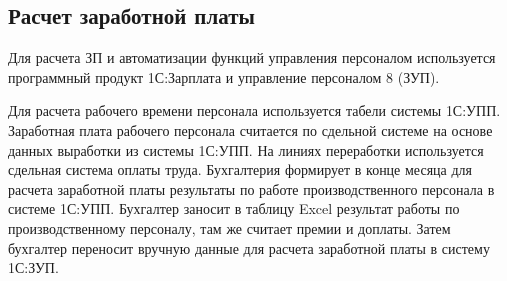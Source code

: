 \subsection{Расчет заработной платы}



Для расчета ЗП и автоматизации функций управления персоналом используется программный продукт 1С:Зарплата и управление персоналом 8 (ЗУП).

Для расчета рабочего времени персонала используется табели системы 1С:УПП. Заработная плата рабочего персонала считается по сдельной системе на основе данных выработки из системы 1С:УПП.
На линиях переработки используется сдельная система оплаты труда. 
Бухгалтерия формирует в конце месяца для расчета заработной платы результаты по работе производственного персонала в системе 1С:УПП. 
Бухгалтер заносит в таблицу Excel результат работы по производственному персоналу, там же считает премии и доплаты.
Затем бухгалтер переносит вручную данные для расчета заработной платы в систему 1С:ЗУП.


